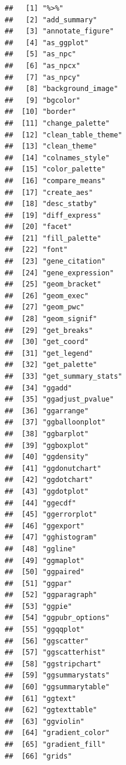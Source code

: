 \documentclass[
]{book}
\begin{document}
\begin{verbatim}
##   [1] "%>%"                        
##   [2] "add_summary"                
##   [3] "annotate_figure"            
##   [4] "as_ggplot"                  
##   [5] "as_npc"                     
##   [6] "as_npcx"                    
##   [7] "as_npcy"                    
##   [8] "background_image"           
##   [9] "bgcolor"                    
##  [10] "border"                     
##  [11] "change_palette"             
##  [12] "clean_table_theme"          
##  [13] "clean_theme"                
##  [14] "colnames_style"             
##  [15] "color_palette"              
##  [16] "compare_means"              
##  [17] "create_aes"                 
##  [18] "desc_statby"                
##  [19] "diff_express"               
##  [20] "facet"                      
##  [21] "fill_palette"               
##  [22] "font"                       
##  [23] "gene_citation"              
##  [24] "gene_expression"            
##  [25] "geom_bracket"               
##  [26] "geom_exec"                  
##  [27] "geom_pwc"                   
##  [28] "geom_signif"                
##  [29] "get_breaks"                 
##  [30] "get_coord"                  
##  [31] "get_legend"                 
##  [32] "get_palette"                
##  [33] "get_summary_stats"          
##  [34] "ggadd"                      
##  [35] "ggadjust_pvalue"            
##  [36] "ggarrange"                  
##  [37] "ggballoonplot"              
##  [38] "ggbarplot"                  
##  [39] "ggboxplot"                  
##  [40] "ggdensity"                  
##  [41] "ggdonutchart"               
##  [42] "ggdotchart"                 
##  [43] "ggdotplot"                  
##  [44] "ggecdf"                     
##  [45] "ggerrorplot"                
##  [46] "ggexport"                   
##  [47] "gghistogram"                
##  [48] "ggline"                     
##  [49] "ggmaplot"                   
##  [50] "ggpaired"                   
##  [51] "ggpar"                      
##  [52] "ggparagraph"                
##  [53] "ggpie"                      
##  [54] "ggpubr_options"             
##  [55] "ggqqplot"                   
##  [56] "ggscatter"                  
##  [57] "ggscatterhist"              
##  [58] "ggstripchart"               
##  [59] "ggsummarystats"             
##  [60] "ggsummarytable"             
##  [61] "ggtext"                     
##  [62] "ggtexttable"                
##  [63] "ggviolin"                   
##  [64] "gradient_color"             
##  [65] "gradient_fill"              
##  [66] "grids"                      

\end{verbatim}
\end{document}

